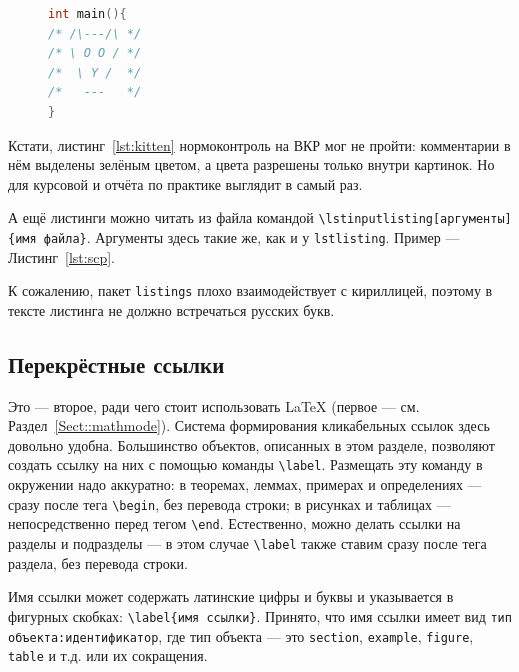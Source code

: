 \documentclass[14pt,russian]{scrartcl}
\begin{document}
\begin{figure}[!htb]
\begin{lstlisting}[language={C},caption={Пример листинга.},label={lst:kitten}]
int main(){
/* /\---/\ */
/* \ O O / */
/*  \ Y /  */
/*   ---   */
}
\end{lstlisting}
\end{figure}

Кстати, листинг~\ref{lst:kitten} нормоконтроль на ВКР мог не пройти: комментарии в нём выделены зелёным цветом, а цвета разрешены только внутри картинок. Но для курсовой и отчёта по практике выглядит в самый раз.

А ещё листинги можно читать из файла командой \texttt{\textbackslash lstinputlisting[аргументы]\{имя файла\}}. Аргументы здесь такие же, как и у \texttt{lstlisting}. Пример --- Листинг~\ref{lst:scp}.

\begin{figure}[!htb]

\end{figure}

К сожалению, пакет \texttt{listings} плохо взаимодействует с кириллицей, поэтому в тексте листинга не должно встречаться русских букв. 

\subsection{Перекрёстные ссылки}

Это --- второе, ради чего стоит использовать \LaTeX{} (первое --- см. Раздел~\ref{Sect::mathmode}). Система формирования кликабельных ссылок здесь довольно удобна. Большинство объектов, описанных в этом разделе, позволяют создать ссылку на них с помощью команды \texttt{\textbackslash{label}}. Размещать эту команду в окружении надо аккуратно: в теоремах, леммах, примерах и определениях --- сразу после тега \texttt{\textbackslash begin}, без перевода строки; в рисунках и таблицах --- непосредственно перед тегом \texttt{\textbackslash end}. Естественно, можно делать ссылки на разделы и подразделы --- в этом случае \texttt{\textbackslash label} также ставим сразу после тега раздела, без перевода строки.

Имя ссылки может содержать латинские цифры и буквы и указывается в фигурных скобках: \texttt{\textbackslash{label\{имя ссылки\}}}. Принято, что имя ссылки имеет вид \texttt{тип объекта:идентификатор}, где тип объекта --- это \texttt{section}, \texttt{example}, \texttt{figure}, \texttt{table} и т.д. или их сокращения. 
\end{document}
